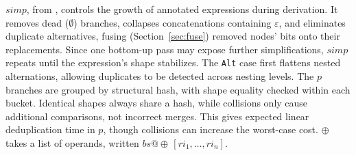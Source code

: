 $\mathit{simp}$, from \citep[Fig.~6]{sulzmannlu2014},
controls the growth of annotated expressions during derivation.
It removes dead ($\emptyset$) branches,
collapses concatenations containing $\varepsilon$,
and eliminates duplicate alternatives,
fusing (Section~\ref{sec:fuse}) removed nodes' bits
onto their replacements.
Since one bottom-up pass may expose further simplifications,
$\mathit{simp}$ repeats until the expression's shape stabilizes.
The \texttt{Alt} case first flattens nested alternations,
allowing duplicates to be detected across nesting levels.
The $p$ branches are grouped by structural hash,
with shape equality checked within each bucket.
Identical shapes always share a hash, while collisions
only cause additional comparisons, not incorrect merges.
This gives expected linear deduplication time in $p$,
though collisions can increase the worst-case cost.
$\oplus$ takes a list of operands,
written $bs@\oplus\,[\mathit{ri}_1,\ldots,\mathit{ri}_n]$.
